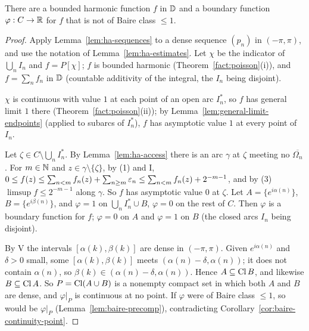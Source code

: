 \begin{theorem}\label{thm:ha-example}
There are a bounded harmonic function $f$ in $\mathbb{D}$ and a boundary function $\varphi:C\to\mathbb{R}$ for $f$ that is not of Baire class $\le1$.
\end{theorem}
\begin{proof}
Apply Lemma~\ref{lem:ha-sequences} to a dense sequence $(p_n)$ in $(-\pi,\pi)$, and use the notation of Lemma~\ref{lem:ha-estimates}.
Let $\chi$ be the indicator of $\bigcup_nI_n$ and $f=P[\chi]$; $f$ is bounded harmonic (Theorem~\ref{fact:poisson}(i)), and $f=\sum_nf_n$ in
$\mathbb{D}$ (countable additivity of the integral, the $I_n$ being disjoint).

$\chi$ is continuous with value $1$ at each point of an open arc $I_n^*$, so $f$ has general limit $1$ there (Theorem~\ref{fact:poisson}(ii));
by Lemma~\ref{lem:general-limit-endpoints} (applied to subarcs of $I_n^*$), $f$ has asymptotic value $1$ at every point of $I_n$.

Let $\zeta\in C\setminus\bigcup_nI_n^*$. By Lemma~\ref{lem:ha-access} there is an arc $\gamma$ at $\zeta$ meeting no $\overline{\Omega_n}$. For $m\in\mathbb{N}$ and
$z\in\gamma\setminus\{\zeta\}$, by (1) and I, $0\le f(z)\le\sum_{n<m}f_n(z)+\sum_{n\ge m}\varepsilon_n\le\sum_{n<m}f_n(z)+2^{-m-1}$, and by (3)
$\limsup f\le2^{-m-1}$ along $\gamma$. So $f$ has asymptotic value $0$ at $\zeta$. Let $A=\{e^{i\alpha(n)}\}$, $B=\{e^{i\beta(n)}\}$, and
$\varphi=1$ on $\bigcup_nI_n^*\cup B$, $\varphi=0$ on the rest of $C$. Then $\varphi$ is a boundary function for $f$; $\varphi=0$ on $A$ and
$\varphi=1$ on $B$ (the closed arcs $I_n$ being disjoint).

By V the intervals $[\alpha(k),\beta(k)]$ are dense in $(-\pi,\pi)$. Given $e^{i\alpha(n)}$ and $\delta>0$ small, some $[\alpha(k),\beta(k)]$ meets
$(\alpha(n)-\delta,\alpha(n))$; it does not contain $\alpha(n)$, so $\beta(k)\in(\alpha(n)-\delta,\alpha(n))$. Hence $A\subseteq\operatorname{Cl} B$, and likewise
$B\subseteq\operatorname{Cl} A$. So $P=\operatorname{Cl}(A\cup B)$ is a nonempty compact set in which both $A$ and $B$ are dense, and $\varphi|_P$ is continuous at no
point. If $\varphi$ were of Baire class $\le1$, so would be $\varphi|_P$ (Lemma~\ref{lem:baire-precomp}), contradicting
Corollary~\ref{cor:baire-continuity-point}.
\end{proof}

